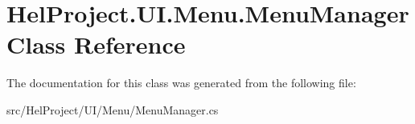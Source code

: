\hypertarget{class_hel_project_1_1_u_i_1_1_menu_1_1_menu_manager}{}\section{Hel\+Project.\+U\+I.\+Menu.\+Menu\+Manager Class Reference}
\label{class_hel_project_1_1_u_i_1_1_menu_1_1_menu_manager}


The documentation for this class was generated from the following file\+:\begin{DoxyCompactItemize}
\item 
src/\+Hel\+Project/\+U\+I/\+Menu/Menu\+Manager.\+cs\end{DoxyCompactItemize}
